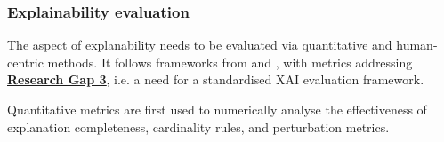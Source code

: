 
\subsubsection*{Explainability evaluation}
The aspect of explanability needs to be evaluated via quantitative and human-centric methods. It follows frameworks from \citep{reddy2023explainable} and \citep{van2024applicability}, with metrics addressing \hyperref[research-gap-3]{\uline{\textbf{Research Gap 3}}}, i.e. a need for a standardised XAI evaluation framework.\newline

\noindent Quantitative metrics are first used to numerically analyse the effectiveness of explanation completeness, cardinality rules, and perturbation metrics.

